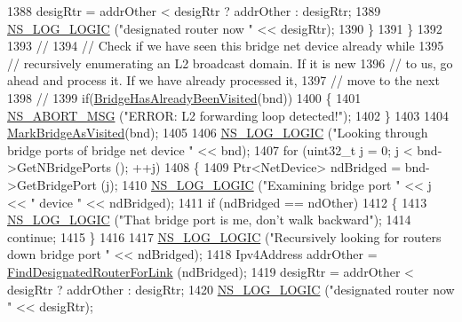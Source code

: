 \begin{DoxyCode}
1388                   desigRtr = addrOther < desigRtr ? addrOther : desigRtr;
1389                   \hyperlink{group__logging_ga88acd260151caf2db9c0fc84997f45ce}{NS\_LOG\_LOGIC} (\textcolor{stringliteral}{"designated router now "} << desigRtr);
1390                 \}
1391             \}
1392 
1393           \textcolor{comment}{// }
1394           \textcolor{comment}{// Check if we have seen this bridge net device already while}
1395           \textcolor{comment}{// recursively enumerating an L2 broadcast domain. If it is new }
1396           \textcolor{comment}{// to us, go ahead and process it. If we have already processed it,}
1397           \textcolor{comment}{// move to the next}
1398           \textcolor{comment}{// }
1399           \textcolor{keywordflow}{if}(\hyperlink{classns3_1_1GlobalRouter_ab358e6c36f04f05c42a4ca2c472c3179}{BridgeHasAlreadyBeenVisited}(bnd))
1400             \{
1401               \hyperlink{group__fatal_ga51ac4699be799d772ae7258d1ef6af21}{NS\_ABORT\_MSG} (\textcolor{stringliteral}{"ERROR: L2 forwarding loop detected!"});
1402             \}
1403 
1404           \hyperlink{classns3_1_1GlobalRouter_a27297efb3e69712604932d5275ab2abb}{MarkBridgeAsVisited}(bnd);
1405 
1406           \hyperlink{group__logging_ga88acd260151caf2db9c0fc84997f45ce}{NS\_LOG\_LOGIC} (\textcolor{stringliteral}{"Looking through bridge ports of bridge net device "} << bnd);
1407           \textcolor{keywordflow}{for} (uint32\_t j = 0; j < bnd->GetNBridgePorts (); ++j)
1408             \{
1409               Ptr<NetDevice> ndBridged = bnd->GetBridgePort (j);
1410               \hyperlink{group__logging_ga88acd260151caf2db9c0fc84997f45ce}{NS\_LOG\_LOGIC} (\textcolor{stringliteral}{"Examining bridge port "} << j << \textcolor{stringliteral}{" device "} << ndBridged);
1411               \textcolor{keywordflow}{if} (ndBridged == ndOther)
1412                 \{
1413                   \hyperlink{group__logging_ga88acd260151caf2db9c0fc84997f45ce}{NS\_LOG\_LOGIC} (\textcolor{stringliteral}{"That bridge port is me, don't walk backward"});
1414                   \textcolor{keywordflow}{continue};
1415                 \}
1416 
1417               \hyperlink{group__logging_ga88acd260151caf2db9c0fc84997f45ce}{NS\_LOG\_LOGIC} (\textcolor{stringliteral}{"Recursively looking for routers down bridge port "} << ndBridged);
1418               Ipv4Address addrOther = \hyperlink{classns3_1_1GlobalRouter_ab562e4407394674ef8502b3ab1d051d6}{FindDesignatedRouterForLink} (ndBridged);
1419               desigRtr = addrOther < desigRtr ? addrOther : desigRtr;
1420               \hyperlink{group__logging_ga88acd260151caf2db9c0fc84997f45ce}{NS\_LOG\_LOGIC} (\textcolor{stringliteral}{"designated router now "} << desigRtr);

\end{DoxyCode}
